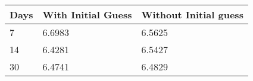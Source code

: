 \begin{tabular}{lll}
Days & With Initial Guess & Without Initial guess \\ 
\hline 
7 & 6.6983 & 6.5625 \\ 
14 & 6.4281 & 6.5427 \\ 
30 & 6.4741 & 6.4829 \\ 
\hline 
\end{tabular}
